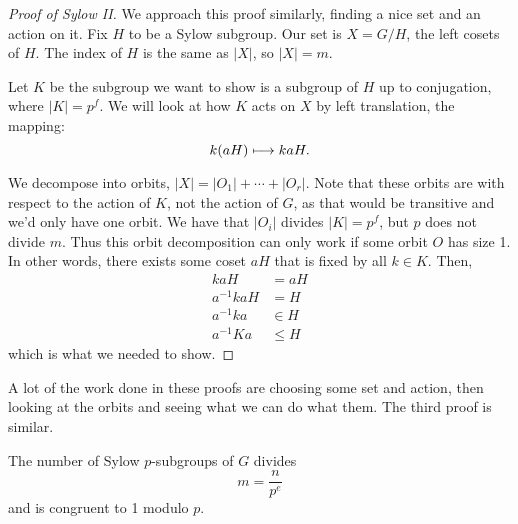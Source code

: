 \begin{proof}[Proof of Sylow II]
    We approach this proof similarly, finding a nice set and an action on it.
    Fix $H$ to be a Sylow subgroup.
    Our set is $X = G/H$, the left cosets of $H$. 
    The index of $H$ is the same as $|X|$, so $|X| = m$. 
    
    Let $K$ be the subgroup we want to show is a subgroup of $H$ up to conjugation, where $|K| = p^f$.
    We will look at how $K$ acts on $X$ by left translation, the mapping: $$k(aH) \longmapsto kaH.$$

    We decompose into orbits, $|X| = |O_1| + \cdots + |O_r|$. 
    Note that these orbits are with respect to the action of $K$, not the action of $G$, as that would be transitive and we'd only have one orbit.
    We have that $|O_i|$ divides $|K| = p^f$, but $p$ does not divide $m$. 
    Thus this orbit decomposition can only work if some orbit $O$ has size 1. 
    In other words, there exists some coset $aH$ that is fixed by all $k \in K$. 
    Then,
    \begin{align*}
        kaH &= aH\\
        a^{-1}kaH &= H \\
        a^{-1} ka &\in H \\
        a^{-1}Ka &\leq H
    \end{align*}
    which is what we needed to show.
\end{proof}
A lot of the work done in these proofs are choosing some set and action, then looking at the orbits and seeing what we can do what them. The third proof is similar. 


\begin{theorem}
The number of Sylow $p$-subgroups of $G$ divides \[m = \frac{n}{p^e}\] and is congruent to 1 modulo $p.$
\end{theorem}


